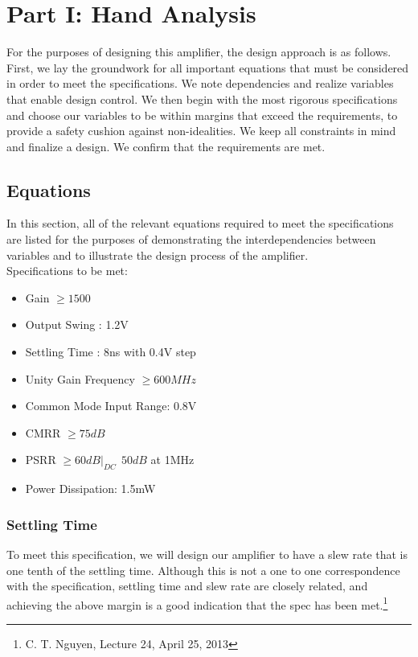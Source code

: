\documentclass[]{article}
\begin{document}
	\section{Part I: Hand Analysis}
		For the purposes of designing this amplifier, the design approach is as follows. First, we lay the groundwork for all important equations that must be considered in order to meet the specifications. We note dependencies and realize variables that enable design control. We then begin with the most rigorous specifications and choose our variables to be within margins that exceed the requirements, to provide a safety cushion against non-idealities. We keep all constraints in mind and finalize a design. We confirm that the requirements are met.
	
		\subsection{Equations}
	
		In this section, all of the relevant equations required to meet the specifications are listed for the purposes of demonstrating the interdependencies between variables and to illustrate the design process of the amplifier.
		$$$$
		Specifications to be met:
	
		\begin{itemize}
			\item Gain $\ge 1500 $
			\item Output Swing : 1.2V
			\item Settling Time : 8ns with 0.4V step
			\item Unity Gain Frequency $\ge 600 MHz$
			\item Common Mode Input Range: 0.8V
			\item CMRR $\ge 75dB$
			\item PSRR $\ge 60dB |_{DC} \ \ 50dB$ at 1MHz
			\item Power Dissipation: 1.5mW
		\end{itemize}
	
		\pagebreak 
	
			\subsubsection{Settling Time}
				$$$$
				To meet this specification, we will design our amplifier to have a slew rate that is one tenth of the settling time. Although this is not a one to one correspondence with the specification, settling time and slew rate are closely related, and achieving the above margin is a good indication that the spec has been met.\footnote{\tiny C. T. Nguyen, Lecture 24, April 25, 2013}
\end{document}
